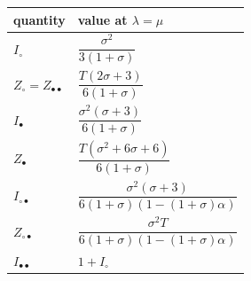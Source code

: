 \documentclass[10pt,]{article}
\begin{document}
\begin{longtable}[]{@{}ll@{}}
\toprule
\begin{minipage}[b]{0.47\columnwidth}\raggedright
quantity\strut
\end{minipage} & \begin{minipage}[b]{0.47\columnwidth}\raggedright
value at \(\lambda=\mu\)\strut
\end{minipage}\tabularnewline
\midrule
\endhead
\begin{minipage}[t]{0.47\columnwidth}\raggedright
\(I_\circ\)\strut
\end{minipage} & \begin{minipage}[t]{0.47\columnwidth}\raggedright
\(\dfrac{\sigma^2}{3(1+\sigma)}\)\strut
\end{minipage}\tabularnewline
\begin{minipage}[t]{0.47\columnwidth}\raggedright
\(Z_\circ=Z_{\bullet\bullet}\)\strut
\end{minipage} & \begin{minipage}[t]{0.47\columnwidth}\raggedright
\(\dfrac{T(2\sigma+3)}{6(1+\sigma)}\)\strut
\end{minipage}\tabularnewline
\begin{minipage}[t]{0.47\columnwidth}\raggedright
\(I_\bullet\)\strut
\end{minipage} & \begin{minipage}[t]{0.47\columnwidth}\raggedright
\(\dfrac{\sigma^2(\sigma+3)}{6(1+\sigma)}\)\strut
\end{minipage}\tabularnewline
\begin{minipage}[t]{0.47\columnwidth}\raggedright
\(Z_\bullet\)\strut
\end{minipage} & \begin{minipage}[t]{0.47\columnwidth}\raggedright
\(\dfrac{T(\sigma^2+6\sigma+6)}{6(1+\sigma)}\)\strut
\end{minipage}\tabularnewline
\begin{minipage}[t]{0.47\columnwidth}\raggedright
\(I_{\circ\bullet}\)\strut
\end{minipage} & \begin{minipage}[t]{0.47\columnwidth}\raggedright
\(\dfrac{\sigma^2(\sigma+3)}{6(1+\sigma)(1-(1+\sigma)\alpha)}\)\strut
\end{minipage}\tabularnewline
\begin{minipage}[t]{0.47\columnwidth}\raggedright
\(Z_{\circ\bullet}\)\strut
\end{minipage} & \begin{minipage}[t]{0.47\columnwidth}\raggedright
\(\dfrac{\sigma^2T}{6(1+\sigma)(1-(1+\sigma)\alpha)}\)\strut
\end{minipage}\tabularnewline
\begin{minipage}[t]{0.47\columnwidth}\raggedright
\(I_{\bullet\bullet}\)\strut
\end{minipage} & \begin{minipage}[t]{0.47\columnwidth}\raggedright
\(1+I_\circ\)\strut
\end{minipage}\tabularnewline
\bottomrule
\end{longtable}
\end{document}
